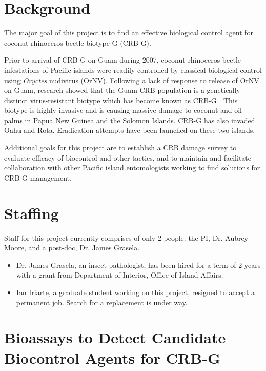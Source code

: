 \documentclass[12pt,letterpaper,english,bibliography=totocnumbered]{scrartcl}
\begin{document}
\newpage
\tableofcontents{}

\newpage

\section{Background}

The major goal of this project is to find an effective biological
control agent for coconut rhinoceros beetle biotype G (CRB-G).

Prior to arrival of CRB-G on Guam during 2007, coconut rhinoceros beetle
infestations of Pacific islands were readily controlled by classical
biological control using \textit{Oryctes} nudivirus (OrNV). Following a lack
of response to release of OrNV on Guam, research showed that the Guam
CRB population is a genetically distinct virus-resistant biotype which
has become known as CRB-G \cite{marshall_new_2017-1}. This biotype is highly invasive and is
causing massive damage to coconut and oil palms in Papua New Guinea
and the Solomon Islands. CRB-G has also invaded Oahu and Rota. Eradication
attempts have been launched on these two islands.

Additional goals for this project are to establish a CRB damage survey to evaluate efficacy of biocontrol and other tactics, and to maintain and facilitate collaboration with other Pacific island entomologists working to find solutions for CRB-G management.

\section{Staffing}

Staff for this project currently comprises of only 2 people: the PI, Dr. Aubrey Moore, and a post-doc, Dr. James Grasela.
\begin{itemize}

    \item Dr. James Grasela, an insect pathologist, has been hired for a term of 2 years with a grant from Department of Interior, Office of Island Affairs.

    \item Ian Iriarte, a graduate student working on this project, resigned to accept a permanent job. Search for a replacement is under way.

\end{itemize}


\section{Bioassays to Detect Candidate Biocontrol Agents for CRB-G}
\end{document}
